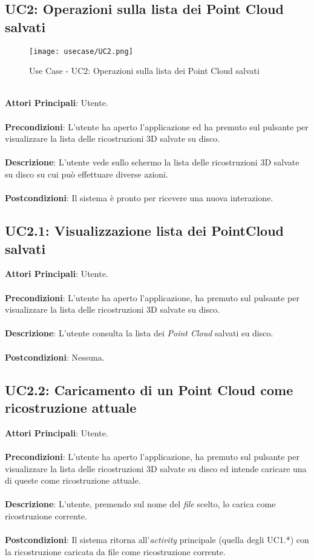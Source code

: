 \subsection{UC2: Operazioni sulla lista dei Point Cloud salvati}
\begin{figure}[!h] 
    \centering 
    \texttt{[image: usecase/UC2.png]} 
    \caption{Use Case - UC2: Operazioni sulla lista dei Point Cloud salvati}
\end{figure}
\ \\
\textbf{Attori Principali}: Utente.
\\\\ \textbf{Precondizioni}: L'utente ha aperto l'applicazione ed ha premuto sul pulsante per visualizzare la lista delle ricostruzioni 3D salvate su disco.
\\\\ \textbf{Descrizione}: L'utente vede sullo schermo la lista delle ricostruzioni 3D salvate su disco su cui può effettuare diverse azioni.
\\\\ \textbf{Postcondizioni}: Il sistema è pronto per ricevere una nuova interazione.


\subsection{UC2.1: Visualizzazione lista dei PointCloud salvati}
\textbf{Attori Principali}: Utente.
\\\\ \textbf{Precondizioni}: L'utente ha aperto l'applicazione, ha premuto sul pulsante per visualizzare la lista delle ricostruzioni 3D salvate su disco.
\\\\ \textbf{Descrizione}: L'utente consulta la lista dei \emph{Point Cloud} salvati su disco.
\\\\ \textbf{Postcondizioni}: Nessuna.

\subsection{UC2.2: Caricamento di un Point Cloud come ricostruzione attuale}
\textbf{Attori Principali}: Utente.
\\\\ \textbf{Precondizioni}: L'utente ha aperto l'applicazione, ha premuto sul pulsante per visualizzare la lista delle ricostruzioni 3D salvate su disco ed intende caricare una di queste come ricostruzione attuale.
\\\\ \textbf{Descrizione}: L'utente, premendo sul nome del \emph{file} scelto, lo carica come ricostruzione corrente.
\\\\ \textbf{Postcondizioni}: Il sistema ritorna all'\emph{activity} principale (quella degli UC1.*) con la ricostruzione caricata da file come ricostruzione corrente.

